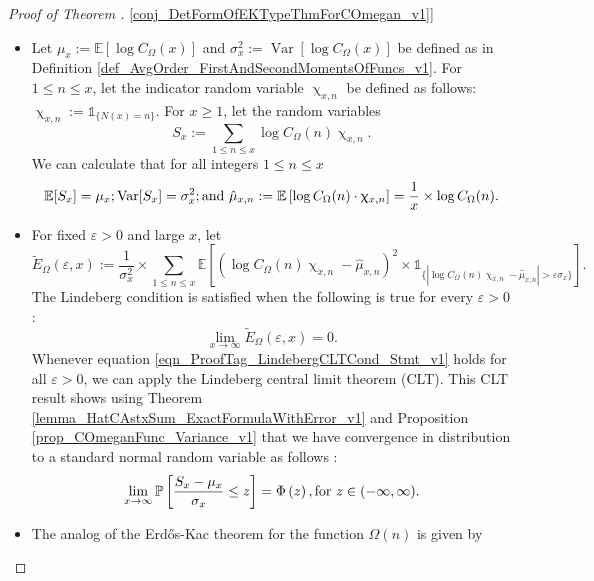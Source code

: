 \documentclass[11pt,reqno,a4letter]{article}
\newcommand{\hlocalref}[1]{\hyperref[#1]{\ref{#1}}}
\numberwithin{equation}{section}
\numberwithin{figure}{section}
\numberwithin{table}{section}
\renewcommand{\chi}{\upchi}
\theoremstyle{plain}
\numberwithin{theorem}{section}
\theoremstyle{definition}
\theoremstyle{remark}
\newcommand{\mathtext}[1]{\text{\rm #1}}
\begin{document}
\begin{proof}[Proof of Theorem \hlocalref{conj_DetFormOfEKTypeThmForCOmegan_v1}]
\begin{itemize}
\[     \times \mathbb{P}\left[C_p^{(x)} \geq 2\right] = o\left(\mathbb{E}[\Theta_{N(x)}]\right). 
\]
Analogous bounds can be proved to relate the variance of these 
two random variables as $x \rightarrow \infty$. 
\item 
Let $\mu_x := \mathbb{E}\left[\log C_{\Omega}(x)\right]$ and 
$\sigma_x^2 := \operatorname{Var}\left[\log C_{\Omega}(x)\right]$ be defined as in 
Definition \hlocalref{def_AvgOrder_FirstAndSecondMomentsOfFuncs_v1}. 
For $1 \leq n \leq x$, let the indicator random variable $\chi_{x,n}$ 
be defined as follows: $\chi_{x,n} := \mathds{1}_{\{N(x)=n\}}$. 
For $x \geq 1$, let the random variables 
\[
S_x := \sum_{1 \leq n \leq x} \log C_{\Omega}(n) \chi_{x,n}. 
\]
We can calculate that for all integers $1 \leq n \leq x$ 
\[
\mathbb{E}[S_x] = \mu_x; \operatorname{Var}[S_x] = \sigma_x^2; 
     \mathtext{ and } 
     \hat{\mu}_{x,n} := \mathbb{E}\left[\log C_{\Omega}(n) \cdot \chi_{x,n}\right] = 
     \frac{1}{x} \times \log C_{\Omega}(n). 
\]
\item 
For fixed $\varepsilon > 0$ and large $x$, let 
\[
\widetilde{E}_{\Omega}(\varepsilon, x) := \frac{1}{\sigma_x^2} \times 
     \sum_{1 \leq n \leq x} \mathbb{E}\left[ 
     \left(\log C_{\Omega}(n) \chi_{x,n} - \hat{\mu}_{x,n}\right)^2 
     \times 
     \mathds{1}_{\{\left\lvert \log C_{\Omega}(n) \chi_{x,n} - \hat{\mu}_{x,n} \right\rvert > 
     \varepsilon \sigma_x\}}\right]. 
\]
The Lindeberg condition is satisfied when the following 
is true for every $\varepsilon > 0$: 
\begin{equation}
\label{eqn_ProofTag_LindebergCLTCond_Stmt_v1}
\lim_{x \rightarrow \infty} \widetilde{E}_{\Omega}(\varepsilon, x) = 0. 
\end{equation}
Whenever equation \eqref{eqn_ProofTag_LindebergCLTCond_Stmt_v1} holds for all $\varepsilon > 0$, 
we can apply the Lindeberg central limit theorem (CLT). This CLT result shows using 
Theorem \hlocalref{lemma_HatCAstxSum_ExactFormulaWithError_v1} and 
Proposition \hlocalref{prop_COmeganFunc_Variance_v1} that we have 
convergence in distribution to a standard normal random variable as follows 
\cite[\S 27]{BILLINGSLY-PROB-AND-MEASURE-BOOK}: 
\begin{equation}
\label{eqn_ProofTag_LindebergCLT_Conclusion_Stmt_v2}
\lim_{x \rightarrow \infty} 
     \mathbb{P}\left[\frac{S_x - \mu_x}{\sigma_x} \leq z\right] = 
	\Phi\left(z\right), \mathtext{ for } z \in (-\infty, \infty).
\end{equation}
\item 
The analog of the Erd\H{o}s-Kac theorem for the function $\Omega(n)$ is given by 

\end{itemize}
\end{proof}
\end{document}

